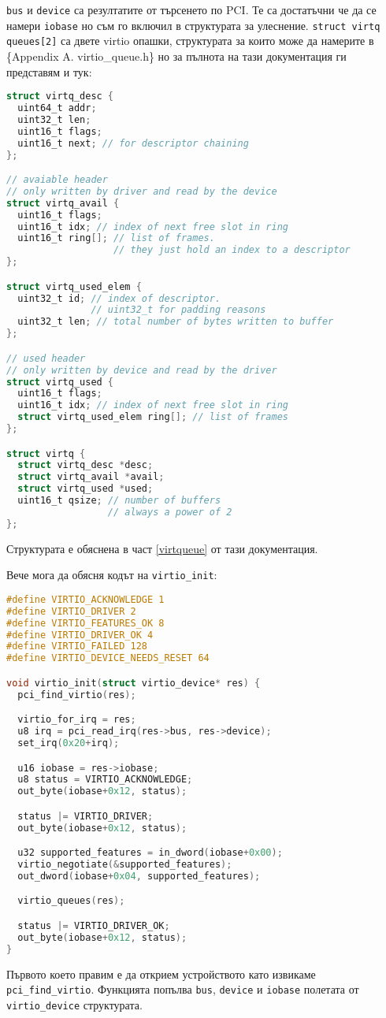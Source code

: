 {\tt bus} и {\tt device} са резултатите от търсенето по PCI. Те са достатъчни че да се намери {\tt iobase} но съм го включил в структурата за улеснение. {\tt struct virtq queues[2]} са двете virtio опашки, структурата за които може да намерите в \{Appendix A. virtio\_queue.h\} но за пълнота на тази документация ги представям и тук:
\begin{lstlisting}[language=C]
struct virtq_desc {
  uint64_t addr;
  uint32_t len;
  uint16_t flags;
  uint16_t next; // for descriptor chaining
};

// avaiable header
// only written by driver and read by the device
struct virtq_avail {
  uint16_t flags;
  uint16_t idx; // index of next free slot in ring
  uint16_t ring[]; // list of frames.
                   // they just hold an index to a descriptor
};

struct virtq_used_elem {
  uint32_t id; // index of descriptor.
               // uint32_t for padding reasons
  uint32_t len; // total number of bytes written to buffer
};

// used header
// only written by device and read by the driver
struct virtq_used {
  uint16_t flags;
  uint16_t idx; // index of next free slot in ring
  struct virtq_used_elem ring[]; // list of frames
};

struct virtq {
  struct virtq_desc *desc;
  struct virtq_avail *avail;
  struct virtq_used *used;
  uint16_t qsize; // number of buffers
                  // always a power of 2
};
\end{lstlisting}
Структурата е обяснена в част \ref{virtqueue} от тази документация.

Вече мога да обясня кодът на {\tt virtio\_init}:
\begin{lstlisting}[language=C]
#define VIRTIO_ACKNOWLEDGE 1
#define VIRTIO_DRIVER 2
#define VIRTIO_FEATURES_OK 8
#define VIRTIO_DRIVER_OK 4
#define VIRTIO_FAILED 128
#define VIRTIO_DEVICE_NEEDS_RESET 64

void virtio_init(struct virtio_device* res) {
  pci_find_virtio(res);

  virtio_for_irq = res;
  u8 irq = pci_read_irq(res->bus, res->device);
  set_irq(0x20+irq);

  u16 iobase = res->iobase;
  u8 status = VIRTIO_ACKNOWLEDGE;
  out_byte(iobase+0x12, status);

  status |= VIRTIO_DRIVER;
  out_byte(iobase+0x12, status);

  u32 supported_features = in_dword(iobase+0x00);
  virtio_negotiate(&supported_features);
  out_dword(iobase+0x04, supported_features);

  virtio_queues(res);

  status |= VIRTIO_DRIVER_OK;
  out_byte(iobase+0x12, status);
}
\end{lstlisting}
Първото което правим е да открием устройството като извикаме {\tt pci\_find\_virtio}. Функцията попълва {\tt bus}, {\tt device} и {\tt iobase} полетата от {\tt virtio\_device} структурата.

